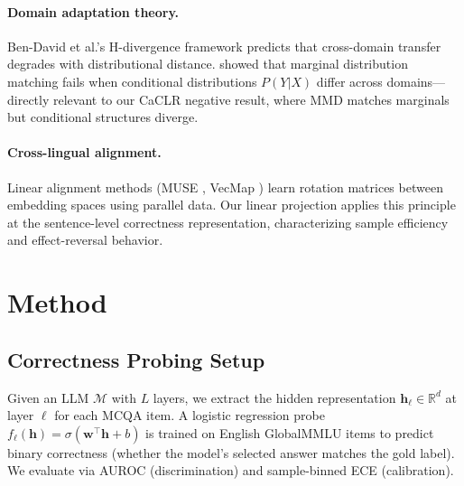 \documentclass[11pt,a4paper]{article}
\newcommand{\auroc}{AUROC}
\newcommand{\ece}{ECE}
\begin{document}
\paragraph{Domain adaptation theory.}
Ben-David et al.'s H-divergence framework \cite{} predicts that cross-domain transfer degrades with distributional distance.
\citet{} showed that marginal distribution matching fails when conditional distributions $P(Y|X)$ differ across domains---directly relevant to our CaCLR negative result, where MMD matches marginals but conditional structures diverge.

\paragraph{Cross-lingual alignment.}
Linear alignment methods (MUSE \cite{}, VecMap \cite{}) learn rotation matrices between embedding spaces using parallel data.
Our linear projection applies this principle at the sentence-level correctness representation, characterizing sample efficiency and effect-reversal behavior.

\section{Method}
\label{sec:method}

\subsection{Correctness Probing Setup}

Given an LLM $\mathcal{M}$ with $L$ layers, we extract the hidden representation $\mathbf{h}_\ell \in \mathbb{R}^d$ at layer $\ell$ for each MCQA item.
A logistic regression probe $f_\ell(\mathbf{h}) = \sigma(\mathbf{w}^\top \mathbf{h} + b)$ is trained on English GlobalMMLU items to predict binary correctness (whether the model's selected answer matches the gold label).
We evaluate via \auroc{} (discrimination) and sample-binned \ece{} (calibration).
\end{document}
